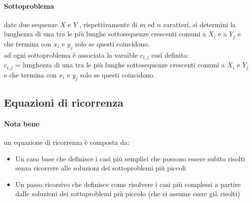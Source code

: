 \documentclass[12pt, a4paper, openany]{book}
\begin{document}

\paragraph*{Sottoproblema} date due sequenze $X$ e $Y$ , rispettivamente di $m$ ed $n$ caratteri, si determini la lunghezza di una tra le più lunghe sottosequenze crescenti comuni
a $X_i$ e a $Y_j$ e che termina con $x_i$ e $y_j$ solo se questi coincidono.
\\ad ogni sottoproblema è associata la varaible $c_{i,j}$ così definita:
\\ $c_{i,j}$ = lunghezza di una tra le più lunghe sottosequenze crescenti comuni a $X_i$ e $Y_j$ e che termina con $x_i$ e $y_j$ solo se questi coincidono.


\subsection*{Equazioni di ricorrenza}
\paragraph*{Nota bene} %
un equazione di ricorrenza è composta da:
\begin{itemize}
	\item Un caso base che definisce i casi più semplici che possono essere subito risolti senza ricorrere alle soluzioni dei sottoproblemi più piccoli
	\item Un passo ricorsivo che definisce come risolvere i casi più complessi a partire dalle soluzioni dei sottoproblemi più piccolo (che si assume essre già risolti)
\end{itemize}
\end{document}
